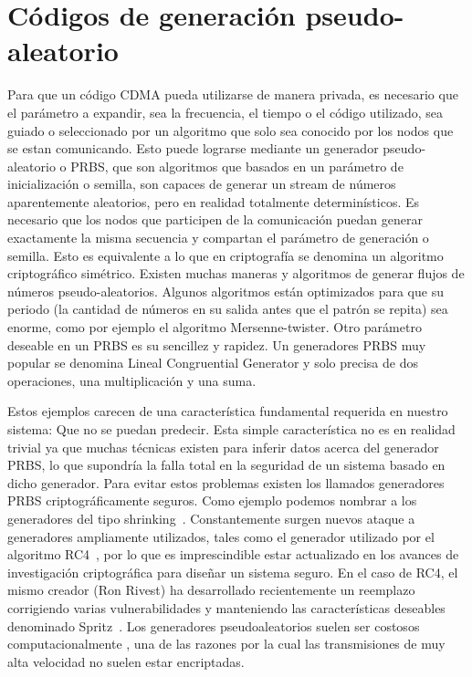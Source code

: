 \section{Códigos de generación pseudo-aleatorio}
\label{PRNGs} 
Para que un código CDMA pueda utilizarse de manera privada, es necesario que el parámetro a expandir, sea la frecuencia, el tiempo o el código utilizado, sea guiado o seleccionado por un algoritmo que solo sea conocido por los nodos que se estan comunicando. Esto puede lograrse mediante un generador pseudo-aleatorio o PRBS, que son algoritmos que basados en un parámetro de inicialización o semilla, son capaces de generar un stream de números aparentemente aleatorios, pero en realidad totalmente determinísticos. 
Es necesario que los nodos que participen de la comunicación puedan generar exactamente la misma secuencia y compartan el parámetro de generación o semilla. Esto es equivalente a lo que en criptografía se denomina un algoritmo criptográfico simétrico.
Existen muchas maneras y algoritmos de generar flujos de números pseudo-aleatorios. Algunos algoritmos están optimizados para que su periodo (la cantidad de números en su salida antes que el patrón se repita) sea enorme, como por ejemplo el algoritmo Mersenne-twister.
Otro parámetro deseable en un PRBS es su sencillez y rapidez. Un generadores PRBS muy popular se denomina Lineal Congruential Generator y solo precisa de dos operaciones, una multiplicación y una suma.

Estos ejemplos carecen de una característica fundamental requerida en nuestro sistema: Que no se puedan predecir. Esta simple característica no es en realidad trivial ya que muchas técnicas existen para inferir datos acerca del generador PRBS, lo que supondría la falla total en la seguridad de un sistema basado en dicho generador. Para evitar estos problemas existen los llamados generadores PRBS criptográficamente seguros. Como ejemplo podemos nombrar a los generadores del tipo shrinking~\cite{coppersmith1994shrinking}.
Constantemente surgen nuevos ataque a generadores ampliamente utilizados, tales como el generador utilizado por el algoritmo RC4~\cite{vaudenay2007passive}, por lo que es imprescindible estar actualizado en los avances de investigación criptográfica para diseñar un sistema seguro. En el caso de RC4, el mismo creador (Ron Rivest) ha desarrollado recientemente un reemplazo corrigiendo varias vulnerabilidades y manteniendo las características deseables denominado Spritz~\cite{RC14}. Los generadores pseudoaleatorios suelen ser costosos computacionalmente , una de las razones por la cual las transmisiones de muy alta velocidad no suelen estar encriptadas. 

